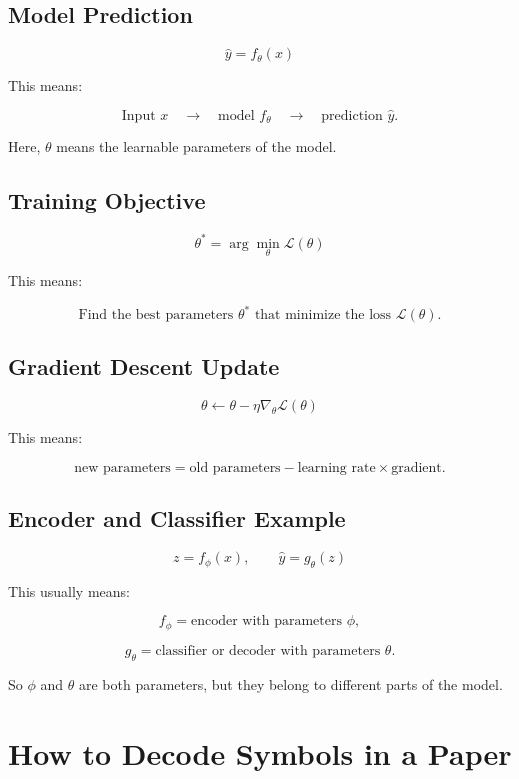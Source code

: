 \documentclass{article}
\begin{document}
\subsection*{Model Prediction}

\[
\hat{y} = f_\theta(x)
\]

This means:

\[
\text{Input } x
\quad \longrightarrow \quad
\text{model } f_\theta
\quad \longrightarrow \quad
\text{prediction } \hat{y}.
\]

Here, $\theta$ means the learnable parameters of the model.

\subsection*{Training Objective}

\[
\theta^* = \arg\min_{\theta} \mathcal{L}(\theta)
\]

This means:

\[
\text{Find the best parameters } \theta^*
\text{ that minimize the loss } \mathcal{L}(\theta).
\]

\subsection*{Gradient Descent Update}

\[
\theta \leftarrow \theta - \eta \nabla_\theta \mathcal{L}(\theta)
\]

This means:

\[
\text{new parameters}
=
\text{old parameters}
-
\text{learning rate}
\times
\text{gradient}.
\]

\subsection*{Encoder and Classifier Example}

\[
z = f_\phi(x),
\qquad
\hat{y} = g_\theta(z)
\]

This usually means:

\[
f_\phi
=
\text{encoder with parameters } \phi,
\]

\[
g_\theta
=
\text{classifier or decoder with parameters } \theta.
\]

So $\phi$ and $\theta$ are both parameters, but they belong to different parts of the model.

\section*{How to Decode Symbols in a Paper}
\end{document}
